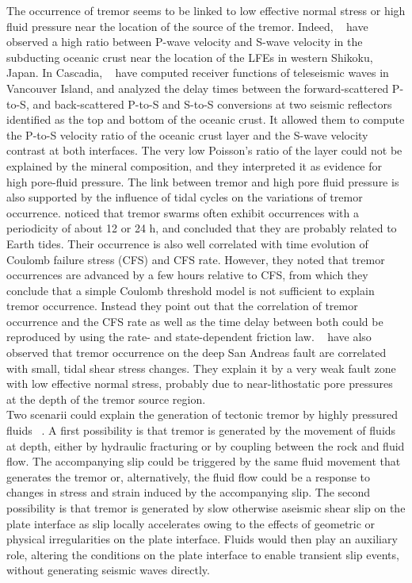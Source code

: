 \documentclass[draft]{agujournal2019}
\begin{document}
The occurrence of tremor seems to be linked to low effective normal stress or high fluid pressure near the location of the source of the tremor. Indeed, ~ have observed a high ratio between P-wave velocity and S-wave velocity in the subducting oceanic crust near the location of the LFEs in western Shikoku, Japan. In Cascadia, ~ have computed receiver functions of teleseismic waves in Vancouver Island, and analyzed the delay times between the forward-scattered P-to-S, and back-scattered P-to-S and S-to-S conversions at two seismic reflectors identified as the top and bottom of the oceanic crust. It allowed them to compute the P-to-S velocity ratio of the oceanic crust layer and the S-wave velocity contrast at both interfaces. The very low Poisson's ratio of the layer could not be explained by the mineral composition, and they interpreted it as evidence for high pore-fluid pressure. The link between tremor and high pore fluid pressure is also supported by the influence of tidal cycles on the variations of tremor occurrence.  noticed that tremor swarms often exhibit occurrences with a periodicity of about 12 or 24 h, and concluded that they are probably related to Earth tides. Their occurrence is also well correlated with time evolution of Coulomb failure stress (CFS) and CFS rate. However, they noted that tremor occurrences are advanced by a few hours relative to CFS, from which they conclude that a simple Coulomb threshold model is not sufficient to explain tremor occurrence. Instead they point out that the correlation of tremor occurrence and the CFS rate as well as the time delay between both could be reproduced by using the rate- and state-dependent friction law. ~ have also observed that tremor occurrence on the deep San Andreas fault are correlated with small, tidal shear stress changes. They explain it by a very weak fault zone with low effective normal stress, probably due to near-lithostatic pore pressures at the depth of the tremor source region. \\

Two scenarii could explain the generation of tectonic tremor by highly pressured fluids ~\cite{SHE_2006}. A first possibility is that tremor is generated by the movement of fluids at depth, either by hydraulic fracturing or by coupling between the rock and fluid flow. The accompanying slip could be triggered by the same fluid movement that generates the tremor or, alternatively, the fluid flow could be a response to changes in stress and strain induced by the accompanying slip. The second possibility is that tremor is generated by slow otherwise aseismic shear slip on the plate interface as slip locally accelerates owing to the effects of geometric or physical irregularities on the plate interface. Fluids would then play an auxiliary role, altering the conditions on the plate interface to enable transient slip events, without generating seismic waves directly. \\
\end{document}
